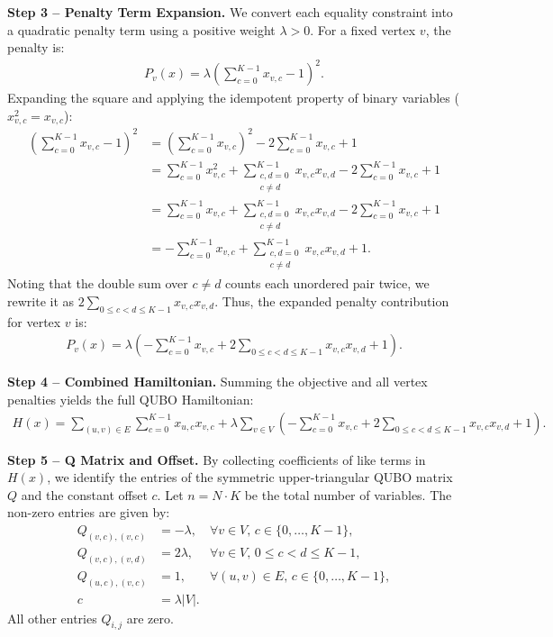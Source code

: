 \documentclass[12pt]{article}
\begin{document}
\textbf{Step 3 -- Penalty Term Expansion.} We convert each equality constraint into a quadratic penalty term using a positive weight $\lambda > 0$. For a fixed vertex $v$, the penalty is:
\begin{align}
    P_v(x) = \lambda \left( \sum_{c=0}^{K-1} x_{v,c} - 1 \right)^2.
\end{align}
Expanding the square and applying the idempotent property of binary variables ($x_{v,c}^2 = x_{v,c}$):
\begin{align}
    \left( \sum_{c=0}^{K-1} x_{v,c} - 1 \right)^2 &= \left( \sum_{c=0}^{K-1} x_{v,c} \right)^2 - 2 \sum_{c=0}^{K-1} x_{v,c} + 1 \\
    &= \sum_{c=0}^{K-1} x_{v,c}^2 + \sum_{\substack{c,d=0 \\ c \neq d}}^{K-1} x_{v,c} x_{v,d} - 2 \sum_{c=0}^{K-1} x_{v,c} + 1 \\
    &= \sum_{c=0}^{K-1} x_{v,c} + \sum_{\substack{c,d=0 \\ c \neq d}}^{K-1} x_{v,c} x_{v,d} - 2 \sum_{c=0}^{K-1} x_{v,c} + 1 \\
    &= -\sum_{c=0}^{K-1} x_{v,c} + \sum_{\substack{c,d=0 \\ c \neq d}}^{K-1} x_{v,c} x_{v,d} + 1.
\end{align}
Noting that the double sum over $c \neq d$ counts each unordered pair twice, we rewrite it as $2 \sum_{0 \le c < d \le K-1} x_{v,c} x_{v,d}$. Thus, the expanded penalty contribution for vertex $v$ is:
\begin{align}
    P_v(x) = \lambda \left( -\sum_{c=0}^{K-1} x_{v,c} + 2 \sum_{0 \le c < d \le K-1} x_{v,c} x_{v,d} + 1 \right).
\end{align}

\textbf{Step 4 -- Combined Hamiltonian.} Summing the objective and all vertex penalties yields the full QUBO Hamiltonian:
\begin{align}
    H(x) = \sum_{(u,v) \in E} \sum_{c=0}^{K-1} x_{u,c} x_{v,c} + \lambda \sum_{v \in V} \left( -\sum_{c=0}^{K-1} x_{v,c} + 2 \sum_{0 \le c < d \le K-1} x_{v,c} x_{v,d} + 1 \right).
\end{align}

\textbf{Step 5 -- Q Matrix and Offset.} By collecting coefficients of like terms in $H(x)$, we identify the entries of the symmetric upper-triangular QUBO matrix $Q$ and the constant offset $c$. Let $n = N \cdot K$ be the total number of variables. The non-zero entries are given by:
\begin{align}
    Q_{(v,c),(v,c)} &= -\lambda, & \forall v \in V, \, c \in \{0,\dots,K-1\}, \\
    Q_{(v,c),(v,d)} &= 2\lambda, & \forall v \in V, \, 0 \le c < d \le K-1, \\
    Q_{(u,c),(v,c)} &= 1, & \forall (u,v) \in E, \, c \in \{0,\dots,K-1\}, \\
    c &= \lambda |V|.
\end{align}
All other entries $Q_{i,j}$ are zero.
\end{document}
